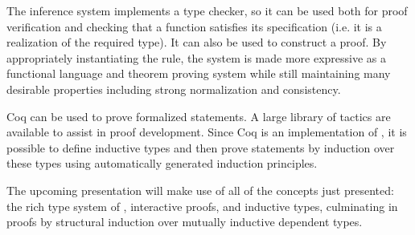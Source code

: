 The \coc{} inference system implements a type checker, so it can be used both for proof verification and checking that a function satisfies its specification (i.e. it is a realization of the required type). It can also be used to construct a proof. By appropriately instantiating the  rule, the system is made more expressive as a functional language and theorem proving system while still maintaining many desirable properties including strong normalization and consistency.

Coq can be used to prove formalized statements. A large library of tactics are available to assist in proof development. Since Coq is an implementation of \cic{}, it is possible to define inductive types and then prove statements by induction over these types using automatically generated induction principles.

The upcoming presentation will make use of all of the concepts just presented: the rich type system of \cic{}, interactive proofs, and inductive types, culminating in proofs by structural induction over mutually inductive dependent types.


